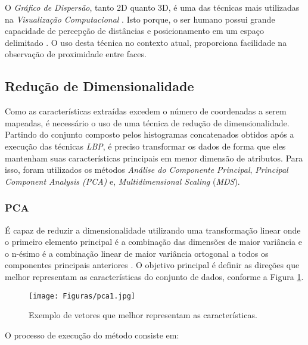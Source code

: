 \documentclass[conference]{IEEEtran}
\begin{document}
O \textit{Gráfico de Dispersão}, tanto 2D quanto 3D, é uma das técnicas mais utilizadas na \textit{Visualização Computacional} \cite{scatter}. Isto porque, o ser humano possui grande capacidade de percepção de distâncias e posicionamento em um espaço delimitado \cite{scatter}. O uso desta técnica no contexto atual, proporciona facilidade na observação de proximidade entre faces.      


\subsection{Redução de Dimensionalidade}

Como as características extraídas excedem o número de coordenadas a serem mapeadas, é necessário o uso de uma técnica de redução de dimensionalidade. Partindo do conjunto composto pelos histogramas concatenados obtidos após a execução das técnicas \textit{LBP}, é preciso transformar os dados de forma que eles mantenham suas características principais em menor dimensão de atributos. Para isso, foram utilizados os métodos \textit{Análise do Componente Principal}, \textit{Principal Component Analysis (PCA)} e, \textit{Multidimensional Scaling} (\textit{MDS}).

\subsubsection{\textbf{PCA}}

É capaz de reduzir a dimensionalidade utilizando uma transformação linear onde o primeiro elemento principal é a combinação das dimensões de maior variância e o n-ésimo é a combinação linear de maior variância ortogonal a todos os componentes principais anteriores \cite{facial2}. O objetivo principal é definir as direções que melhor representam as características do conjunto de dados, conforme a Figura \ref{fig_pca1}.

\begin{figure}[h]
  \begin{center}
    \leavevmode
    \texttt{[image: Figuras/pca1.jpg]}
    \caption{Exemplo de vetores que melhor representam as características.}
    \label{fig_pca1}
  \end{center}
\end{figure}

O processo de execução do método consiste em:
\end{document}
